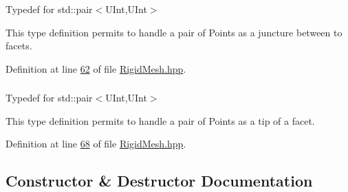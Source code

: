 \subsubsection[{\texorpdfstring{Fracture\+\_\+\+Juncture}{Fracture_Juncture}}]{}\hypertarget{classFVCode3D_1_1Rigid__Mesh_a7c7beee55763889ef7a4d0bc48392084}{}\label{classFVCode3D_1_1Rigid__Mesh_a7c7beee55763889ef7a4d0bc48392084}


Typedef for std\+::pair$<$\+U\+Int,\+U\+Int$>$ 

This type definition permits to handle a pair of Points as a juncture between to facets. 

Definition at line \hyperlink{RigidMesh_8hpp_source_l00062}{62} of file \hyperlink{RigidMesh_8hpp_source}{Rigid\+Mesh.\+hpp}.

\subsubsection[{\texorpdfstring{Fracture\+\_\+\+Tip}{Fracture_Tip}}]{}\hypertarget{classFVCode3D_1_1Rigid__Mesh_a114241afca8d7f22e28397e6a59c931f}{}\label{classFVCode3D_1_1Rigid__Mesh_a114241afca8d7f22e28397e6a59c931f}


Typedef for std\+::pair$<$\+U\+Int,\+U\+Int$>$ 

This type definition permits to handle a pair of Points as a tip of a facet. 

Definition at line \hyperlink{RigidMesh_8hpp_source_l00068}{68} of file \hyperlink{RigidMesh_8hpp_source}{Rigid\+Mesh.\+hpp}.



\subsection{Constructor \& Destructor Documentation}
